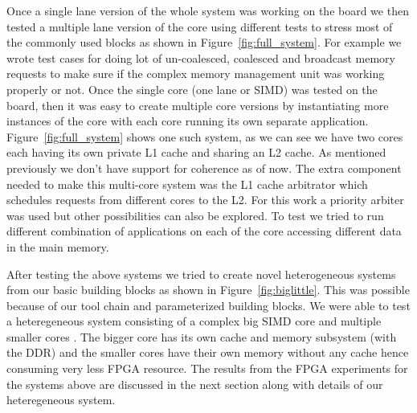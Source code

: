 Once a single lane version of the whole system was working on the board we then tested a multiple lane version of the core using different tests to stress most of the commonly used blocks as shown in Figure~\ref{fig:full_system}. For example we wrote test cases for doing lot of un-coalesced, coalesced and broadcast memory requests to make sure if the complex memory management unit was working properly or not. Once the single core (one lane or SIMD) was tested on the board, then it was easy to create multiple core versions by instantiating more instances of the core with each core running its own separate application. Figure~\ref{fig:full_system} shows one such system, as we can see we have two cores each having its own private L1 cache and sharing an L2 cache. As mentioned previously we don't have support for coherence as of now. The extra component needed to make this multi-core system was the L1 cache arbitrator which schedules requests from different cores to the L2. For this work a priority arbiter was used but other possibilities can also be explored.  To test we tried to run different combination of applications on each of the core accessing different data in the main memory. 


After testing the above systems we tried to create novel heterogeneous systems from our basic building blocks as shown in Figure~\ref{fig:biglittle}. This was possible because of our tool chain and parameterized building blocks. We were able to test a heteregeneous system consisting of a complex big SIMD core and multiple smaller cores \cite{biglittle}. The bigger core has its own cache and memory subsystem (with the DDR) and the smaller cores have their own memory without any cache hence consuming very less FPGA resource. The results from the FPGA experiments for the systems above are discussed in the next section along with details of our heteregeneous system.
